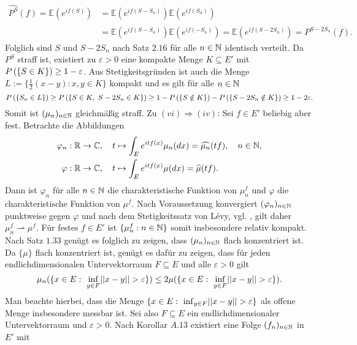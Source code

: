 \begin{proof*}
\begin{align*}
        \widehat{P^S}(f) = \mathbb{E}(e^{if(S)}) &= \mathbb{E}(e^{if(S-S_n)})\mathbb{E}(e^{if(S_n)})  \\\
                                        &= \mathbb{E}(e^{if(S-S_n)})\mathbb{E}(e^{if(-S_n)}) = \mathbb{E}(e^{if(S-2S_n)}) = \widehat{P^{S-2S_n}}(f).
    \end{align*}
    Folglich sind $S$ und $S - 2S_n$ nach Satz $2.16$ für alle $n \in \mathbb{N}$  identisch verteilt. Da $P^S$ straff ist, existiert zu $\varepsilon >0$ eine kompakte Menge $K \subseteq E'$ mit $P\left(\left\{ S \in K \right\}\right) \geq 1 - \varepsilon$. 
    Aus Stetigkeitsgründen ist auch die Menge $L := \{\frac{1}{2}(x-y): x,y \in K\}$ kompakt und es gilt für alle $n \in \mathbb{N}$
    $$
        \prob{S_n \in L} \geq \prob{S \in K, \ S-2S_n \in K} \geq 1 - \prob{S \notin K} - \prob{S-2S_n \notin K} \geq 1 - 2\varepsilon. 
    $$ 
    Somit ist $(\mu_n)_{n \in \mathbb{N}}$ gleichmäßig straff. 
    \newline
    Zu $(vi) \Rightarrow (iv)$: 
    Sei $f \in E'$ beliebig aber fest. Betrachte die Abbildungen 
    \begin{align*}
        \varphi_n &: \mathbb{R} \to \mathbb{C}, \quad t \mapsto \int_E e^{itf(x)}\mu_n(dx) = \widehat{\mu_n}(tf), \quad n \in \mathbb{N}, \\\
        \varphi   &: \mathbb{R} \to \mathbb{C}, \quad t \mapsto \int_E e^{itf(x)}\mu(dx) = \widehat{\mu}(tf). 
    \end{align*}
    Dann ist $\varphi_n$ für alle $n \in \mathbb{N}$ die charakteristische Funktion von $\mu_n^{f}$ und $\varphi$ die charakteristische Funktion von $\mu^f$. Nach Voraussetzung konvergiert $(\varphi_n)_{n \in \mathbb{N}}$ punktweise gegen $\varphi$ und nach 
    dem Stetigkeitssatz von Lévy, vgl. \cite[Satz 8.7.5]{gs}, gilt daher $\mu_n^f \rightharpoonup \mu^f$. Für festes $f \in E'$ ist $\{\mu_n^f : n \in \mathbb{N}\}$ somit insbesondere relativ kompakt.
     Nach Satz $1.33$ genügt es folglich zu zeigen, dass $(\mu_n)_{n \in \mathbb{N}}$ flach konzentriert ist. 
    Da $\{\mu\}$ flach konzentriert ist, genügt es dafür zu zeigen, dass für jeden endlichdimensionalen Untervektorraum $F \subseteq E$ und alle $\varepsilon > 0$ gilt 
    $$
        \mu_n(\{x \in E: \ \inf_{y \in F}\lvert\lvert x-y \rvert\rvert > \varepsilon \}) \leq 2 \mu(\{x \in E: \ \inf_{y \in F}\lvert\lvert x-y \rvert\rvert > \varepsilon \}).
    $$
    Man beachte hierbei, dass die Menge $\{x \in E: \ \inf_{y \in F}\lvert\lvert x-y \rvert\rvert > \varepsilon \}$ als offene Menge insbesondere messbar ist. 
    Sei also $F \subseteq E$ ein endlichdimensionaler Untervektorraum und $\varepsilon >0$. Nach Korollar $A.13$ existiert eine Folge $(f_n)_{n \in \mathbb{N}}$ in $E'$ mit 

\end{proof*}
